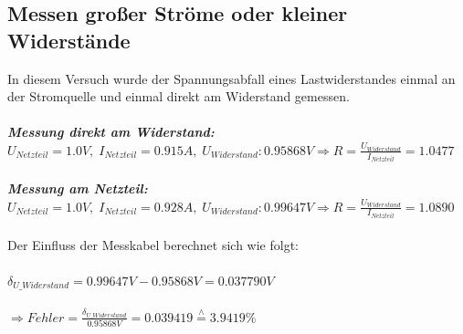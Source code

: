 \subsection{Messen großer Ströme oder kleiner Widerstände}
In diesem Versuch wurde der Spannungsabfall eines Lastwiderstandes einmal an der Stromquelle und einmal direkt am Widerstand gemessen.\\\\
\emph{\textbf{Messung direkt am Widerstand:}}\\
$U_{Netzteil}=1.0V,\; I_{Netzteil}=0.915A,\; U_{Widerstand}: 0.95868V \Rightarrow R=\frac{U_{Widerstand}}{I_{Netzteil}}=1.0477$\\\\
\emph{\textbf{Messung am Netzteil:}}\\
$U_{Netzteil}=1.0V,\; I_{Netzteil}=0.928A,\; U_{Widerstand}: 0.99647V \Rightarrow R=\frac{U_{Widerstand}}{I_{Netzteil}}=1.0890$\\\\
Der Einfluss der Messkabel berechnet sich wie folgt:\\\\
$\delta_{U\_Widerstand}=0.99647V-0.95868V=0.037790V$\\\\
$\Rightarrow Fehler=\frac{\delta_{U\_Widerstand} }{0.95868V}=0.039419 \stackrel{\wedge}{=} 3.9419\%$

